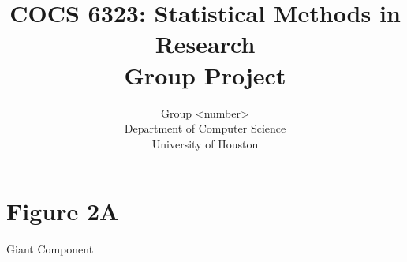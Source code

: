 \documentclass[10pt]{article}         %
\title{COCS 6323: Statistical Methods in Research \\ Group Project} %
\author{Group <number> \\
        Department of Computer Science\\
        University of Houston}         %
\begin{document}



\maketitle              %

\newpage
\tableofcontents        %
\listoftables           %
\listoffigures          %

\newpage
\section{Figure 2A}
Giant Component\\
\end{document}
